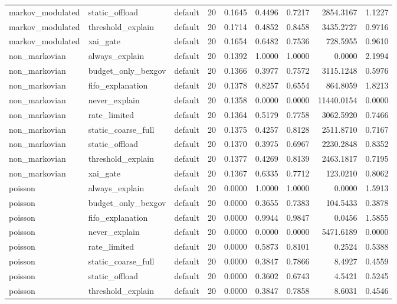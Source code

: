 \begin{table}[t]
\begin{tabular}{lllrrrrrr}
markov\_modulated & static\_offload & default & 20 & 0.1645 & 0.4496 & 0.7217 & 2854.3167 & 1.1227 \\
markov\_modulated & threshold\_explain & default & 20 & 0.1714 & 0.4852 & 0.8458 & 3435.2727 & 0.9716 \\
markov\_modulated & xai\_gate & default & 20 & 0.1654 & 0.6482 & 0.7536 & 728.5955 & 0.9610 \\
non\_markovian & always\_explain & default & 20 & 0.1392 & 1.0000 & 1.0000 & 0.0000 & 2.1994 \\
non\_markovian & budget\_only\_bexgov & default & 20 & 0.1366 & 0.3977 & 0.7572 & 3115.1248 & 0.5976 \\
non\_markovian & fifo\_explanation & default & 20 & 0.1378 & 0.8257 & 0.6554 & 864.8059 & 1.8213 \\
non\_markovian & never\_explain & default & 20 & 0.1358 & 0.0000 & 0.0000 & 11440.0154 & 0.0000 \\
non\_markovian & rate\_limited & default & 20 & 0.1364 & 0.5179 & 0.7758 & 3062.5920 & 0.7466 \\
non\_markovian & static\_coarse\_full & default & 20 & 0.1375 & 0.4257 & 0.8128 & 2511.8710 & 0.7167 \\
non\_markovian & static\_offload & default & 20 & 0.1370 & 0.3975 & 0.6967 & 2230.2848 & 0.8352 \\
non\_markovian & threshold\_explain & default & 20 & 0.1377 & 0.4269 & 0.8139 & 2463.1817 & 0.7195 \\
non\_markovian & xai\_gate & default & 20 & 0.1367 & 0.6335 & 0.7712 & 123.0210 & 0.8062 \\
poisson & always\_explain & default & 20 & 0.0000 & 1.0000 & 1.0000 & 0.0000 & 1.5913 \\
poisson & budget\_only\_bexgov & default & 20 & 0.0000 & 0.3655 & 0.7383 & 104.5433 & 0.3878 \\
poisson & fifo\_explanation & default & 20 & 0.0000 & 0.9944 & 0.9847 & 0.0456 & 1.5855 \\
poisson & never\_explain & default & 20 & 0.0000 & 0.0000 & 0.0000 & 5471.6189 & 0.0000 \\
poisson & rate\_limited & default & 20 & 0.0000 & 0.5873 & 0.8101 & 0.2524 & 0.5388 \\
poisson & static\_coarse\_full & default & 20 & 0.0000 & 0.3847 & 0.7866 & 8.4927 & 0.4559 \\
poisson & static\_offload & default & 20 & 0.0000 & 0.3602 & 0.6743 & 4.5421 & 0.5245 \\
poisson & threshold\_explain & default & 20 & 0.0000 & 0.3847 & 0.7858 & 8.6031 & 0.4546 \\

\end{tabular}
\end{table}
